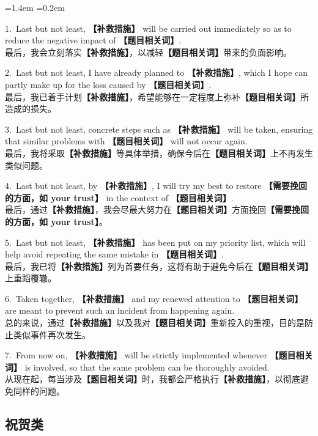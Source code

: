 \documentclass[11pt,a4paper]{ctexart}
\newcommand{\fillin}[1]{{\bfseries【#1】}}
\newenvironment{eg}{%
  \par\addvspace{4pt}%
  \begin{list}{}{\leftmargin=1.4em \rightmargin=0.2em \listparindent=0pt
    \itemindent=0pt \topsep=0pt \parsep=2pt \itemsep=2pt \partopsep=0pt}%
  \item\relax
}{%
  \end{list}\addvspace{5pt}%
}
\begin{document}
\begin{eg}
1.\ Last but not least, \fillin{补救措施} will be carried out immediately so as to reduce the negative impact of \fillin{题目相关词}.\\
最后，我会立刻落实\fillin{补救措施}，以减轻\fillin{题目相关词}带来的负面影响。

2.\ Last but not least, I have already planned to \fillin{补救措施}, which I hope can partly make up for the loss caused by \fillin{题目相关词}.\\
最后，我已着手计划\fillin{补救措施}，希望能够在一定程度上弥补\fillin{题目相关词}所造成的损失。

3.\ Last but not least, concrete steps such as \fillin{补救措施} will be taken, ensuring that similar problems with \fillin{题目相关词} will not occur again.\\
最后，我将采取\fillin{补救措施}等具体举措，确保今后在\fillin{题目相关词}上不再发生类似问题。

4.\ Last but not least, by \fillin{补救措施}, I will try my best to restore \fillin{需要挽回的方面，如 your trust} in the context of \fillin{题目相关词}.\\
最后，通过\fillin{补救措施}，我会尽最大努力在\fillin{题目相关词}方面挽回\fillin{需要挽回的方面，如 your trust}。

5.\ Last but not least, \fillin{补救措施} has been put on my priority list, which will help avoid repeating the same mistake in \fillin{题目相关词}.\\
最后，我已将\fillin{补救措施}列为首要任务，这将有助于避免今后在\fillin{题目相关词}上重蹈覆辙。

6.\ Taken together, \fillin{补救措施} and my renewed attention to \fillin{题目相关词} are meant to prevent such an incident from happening again.\\
总的来说，通过\fillin{补救措施}以及我对\fillin{题目相关词}重新投入的重视，目的是防止类似事件再次发生。

7.\ From now on, \fillin{补救措施} will be strictly implemented whenever \fillin{题目相关词} is involved, so that the same problem can be thoroughly avoided.\\
从现在起，每当涉及\fillin{题目相关词}时，我都会严格执行\fillin{补救措施}，以彻底避免同样的问题。
\end{eg}


\subsection{祝贺类}
\end{document}
